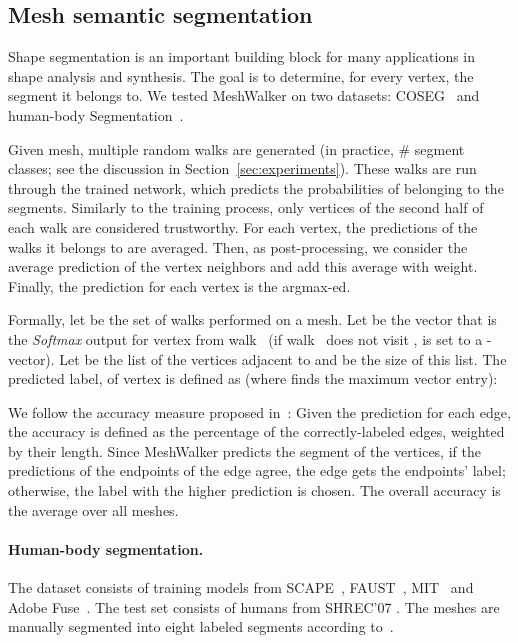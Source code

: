 \documentclass[acmtog]{acmart}
\begin{document}
\subsection{Mesh semantic segmentation}
\label{subsec:segmentation}
Shape segmentation is an important building block for many applications in shape analysis and synthesis.
The goal is to determine, for every vertex, the segment it belongs to.
We tested  MeshWalker on two datasets: COSEG~\cite{wang2012active} and human-body Segmentation~\cite{maron2017convolutional}. 

Given mesh, multiple  random walks are generated (in practice,   \# segment classes; see the discussion in Section~\ref{sec:experiments}).
These walks are run through the trained network, which predicts the probabilities of belonging to the segments.
Similarly to the training process, only vertices of the second half of each walk are considered trustworthy.
For each vertex, the predictions of the walks it belongs to are averaged.
Then, as post-processing, we consider the average prediction of the vertex neighbors and add  this average with  weight. 
Finally, the prediction for each vertex is the argmax-ed.

Formally, let  be the set of walks performed on a mesh.
Let  be the vector that is the {\em Softmax} output for vertex  from walk~ (if walk~ does not visit ,  is set to a -vector).
Let  be the list of the vertices adjacent to  and  be the size of this list.
The predicted label,   of vertex  is defined as (where  finds the maximum vector entry):


We follow the accuracy measure proposed in~\cite{hanocka2019meshcnn}:
Given the prediction for each edge, the accuracy is defined as the percentage of the correctly-labeled edges, weighted by their length.
Since MeshWalker predicts the segment of the vertices, if the predictions of the endpoints of the edge agree, the edge gets the endpoints' label; otherwise,  the label with the higher prediction is chosen.
The overall accuracy is the average over all meshes.

\paragraph{Human-body segmentation.}
The dataset consists of  training models from SCAPE~\cite{anguelov2005scape}, FAUST~\cite{bogo2014faust}, MIT~\cite{vlasic2008articulated} and Adobe Fuse~\cite{Adobe2016}.
The test set consists of  humans from SHREC'07 \cite{giorgi2007shape} .
The meshes are manually segmented into eight labeled segments according to~\cite{kalogerakis2010learning}. 
\end{document}
